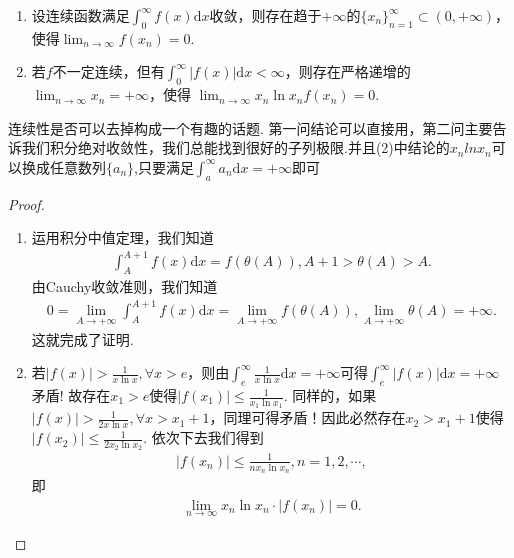 \documentclass[../../main.tex]{subfiles}
\begin{document}
\begin{proposition}[积分收敛必有子列趋于0]\label{proposition:积分收敛必有子列趋于0}
\begin{enumerate}[(1)]
\item 设连续函数满足$\int_{0}^{\infty}f(x)\mathrm{d}x$收敛，则存在趋于$+\infty$的$\{x_n\}_{n = 1}^{\infty}\subset(0,+\infty)$，使得$\lim_{n\to\infty}f(x_n)=0$.

\item 若$f$不一定连续，但有$\int_{0}^{\infty}|f(x)|\mathrm{d}x < \infty$，则存在严格递增的$\lim_{n\to\infty}x_n = +\infty$，使得
$\lim_{n\to\infty}x_n\ln x_nf(x_n)=0$.
\end{enumerate}
\end{proposition}
\begin{note}
连续性是否可以去掉构成一个有趣的话题. 第一问结论可以直接用，第二问主要告诉我们积分绝对收敛性，我们总能找到很好的子列极限.并且(2)中结论的$x_nlnx_n$可以换成任意数列$\{a_n\}$,只要满足$\int_{a}^{\infty}a_n\mathrm{d}x=+\infty$即可
\end{note}
\begin{proof}
\begin{enumerate}[(1)]
\item 运用积分中值定理，我们知道
\begin{align*}
\int_{A}^{A + 1}f(x)\mathrm{d}x = f(\theta(A)), A + 1 > \theta(A) > A.
\end{align*}
由Cauchy收敛准则，我们知道
\begin{align*}
0 = \lim_{A\to +\infty}\int_{A}^{A + 1}f(x)\mathrm{d}x = \lim_{A\to +\infty}f(\theta(A)), \lim_{A\to +\infty}\theta(A) = +\infty.
\end{align*}
这就完成了证明.

\item 若$|f(x)| > \frac{1}{x\ln x}, \forall x > e$，则由$\int_{e}^{\infty}\frac{1}{x\ln x}\mathrm{d}x = +\infty$可得$\int_e^{\infty}{\left| f\left( x \right) \right|\mathrm{d}x}=+\infty $矛盾! 故存在$x_1 > e$使得$|f(x_1)| \leqslant \frac{1}{x_1\ln x_1}$.
同样的，如果$|f(x)| > \frac{1}{2x\ln x}, \forall x > x_1 + 1$，同理可得矛盾！因此必然存在$x_2 > x_1 + 1$使得$|f(x_2)| \leqslant \frac{1}{2x_2\ln x_2}$. 依次下去我们得到
\begin{align*}
|f(x_n)| \leqslant \frac{1}{nx_n\ln x_n}, n = 1,2,\cdots,
\end{align*}
即
\begin{align*}
\lim_{n\to\infty}x_n\ln x_n\cdot|f(x_n)| = 0.
\end{align*} 
\end{enumerate}

\end{proof}
\end{document}
